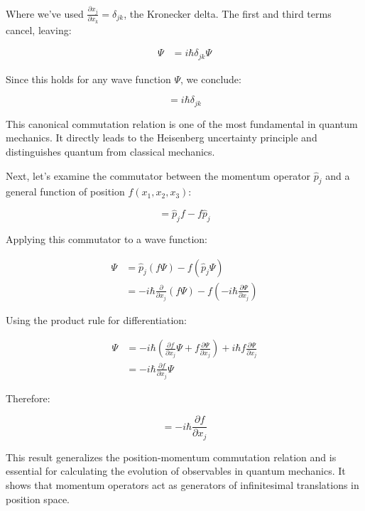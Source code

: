 \documentclass[10pt]{article}
\begin{document}
Where we've used $\frac{\partial x_j}{\partial x_k} = \delta_{jk}$, the Kronecker delta. The first and third terms cancel, leaving:

\begin{align*}
[x_j, \hat{p}_k]\Psi &= i\hbar\delta_{jk}\Psi
\end{align*}

Since this holds for any wave function $\Psi$, we conclude:

\begin{equation*}
[x_j, \hat{p}_k] = i\hbar\delta_{jk} \tag{1.59}
\end{equation*}

This canonical commutation relation is one of the most fundamental in quantum mechanics. It directly leads to the Heisenberg uncertainty principle and distinguishes quantum from classical mechanics.

Next, let's examine the commutator between the momentum operator $\hat{p}_j$ and a general function of position $f(x_1,x_2,x_3)$:

\begin{equation*}
[\hat{p}_j, f] = \hat{p}_j f - f\hat{p}_j \tag{1.60}
\end{equation*}

Applying this commutator to a wave function:

\begin{align*}
[\hat{p}_j, f]\Psi &= \hat{p}_j(f\Psi) - f(\hat{p}_j\Psi) \\
&= -i\hbar\frac{\partial}{\partial x_j}(f\Psi) - f\left(-i\hbar\frac{\partial\Psi}{\partial x_j}\right)
\end{align*}

Using the product rule for differentiation:

\begin{align*}
[\hat{p}_j, f]\Psi &= -i\hbar\left(\frac{\partial f}{\partial x_j}\Psi + f\frac{\partial\Psi}{\partial x_j}\right) + i\hbar f\frac{\partial\Psi}{\partial x_j} \tag{1.61} \\
&= -i\hbar\frac{\partial f}{\partial x_j}\Psi
\end{align*}

Therefore:

\begin{equation*}
[\hat{p}_j, f] = -i\hbar\frac{\partial f}{\partial x_j}
\end{equation*}

This result generalizes the position-momentum commutation relation and is essential for calculating the evolution of observables in quantum mechanics. It shows that momentum operators act as generators of infinitesimal translations in position space.
\end{document}
